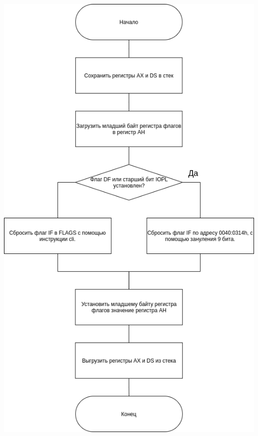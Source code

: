     \begin{center}
      \includegraphics[scale=0.6]{images/scheme-sub_1.drawio.png}
    \end{center}
